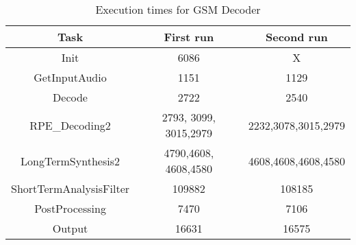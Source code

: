 \documentclass[12pt]{article}
\begin{document}
\begin{table}[h]
  \centering
  \begin{tabular}{c c c}
    \hline
    Task & First run & Second run \\
    \hline
    Init & 6086 & X \\
    GetInputAudio &1151 & 1129\\
    Decode & 2722& 2540\\
    RPE_Decoding2 & 2793, 3099, 3015,2979& 2232,3078,3015,2979\\
    LongTermSynthesis2 &4790,4608, 4608,4580& 4608,4608,4608,4580 \\
    ShortTermAnalysisFilter & 109882 & 108185\\
    PostProcessing & 7470& 7106\\
    Output & 16631& 16575\\
  \end{tabular}
  \caption{Execution times for GSM Decoder}
\end{table}
\end{document}
